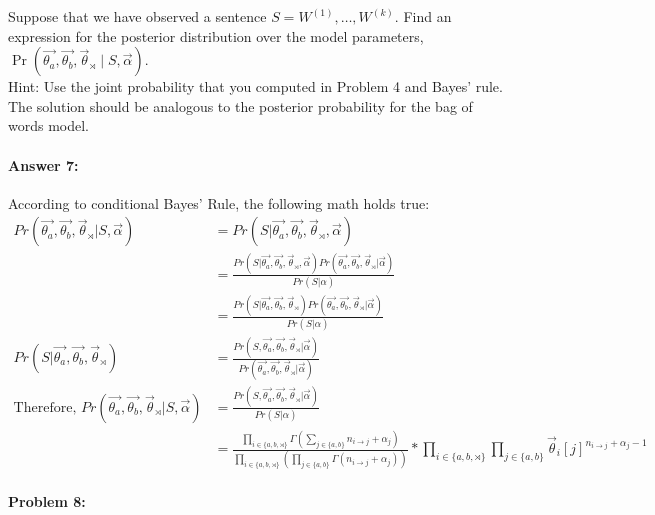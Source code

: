 \documentclass[10pt]{article}
\begin{document}
Suppose that we have observed a sentence
$S=W^{(1)},\dots,W^{(k)}$. Find an expression for the posterior
distribution over the model parameters,
$\Pr(\vec{\theta_a}, \vec{\theta_b}, \vec{\theta}_{\rtimes} \mid S,
\vec{\alpha})$.\\

\noindent Hint: Use the joint probability that you computed in Problem
4 and Bayes' rule. The solution should be analogous to the posterior
probability for the bag of words model.

\paragraph{Answer 7:} According to conditional Bayes' Rule, the following math holds true:
\begin{equation*}
    \begin{split}
        Pr(\vec{\theta_a}, \vec{\theta_b}, \vec{\theta}_{\rtimes} | S, \vec{\alpha}) 
        &= Pr(S | \vec{\theta_a}, \vec{\theta_b}, \vec{\theta}_{\rtimes}, \vec{\alpha})\\
        &= \frac{Pr(S | \vec{\theta_a}, \vec{\theta_b}, \vec{\theta}_{\rtimes}, \vec{\alpha}) Pr(\vec{\theta_a}, \vec{\theta_b}, \vec{\theta}_{\rtimes} | \vec{\alpha})}{Pr(S | \alpha)}\\
        &=\frac{Pr(S | \vec{\theta_a}, \vec{\theta_b}, \vec{\theta}_{\rtimes}) Pr(\vec{\theta_a}, \vec{\theta_b}, \vec{\theta}_{\rtimes} | \vec{\alpha})}{Pr(S|\alpha)}\\
        Pr(S | \vec{\theta_a}, \vec{\theta_b}, \vec{\theta}_{\rtimes}) 
        &= \frac{Pr(S, \vec{\theta_a}, \vec{\theta_b}, \vec{\theta}_{\rtimes} | \vec{\alpha})}{Pr(\vec{\theta_a}, \vec{\theta_b}, \vec{\theta}_{\rtimes} | \vec{\alpha})}\\
        \text{Therefore, } Pr(\vec{\theta_a}, \vec{\theta_b}, \vec{\theta}_{\rtimes} | S, \vec{\alpha}) 
        &=\frac{Pr(S, \vec{\theta_a}, \vec{\theta_b}, \vec{\theta}_{\rtimes} | \vec{\alpha})}{Pr(S|\alpha)}\\
        &= \frac{\prod_{i \in \{a,b,\rtimes\}}\Gamma(\sum_{j \in \{a,b\}} n_{i \rightarrow j} + \alpha_{j})}{\prod_{i\in\{a,b,\rtimes\}}(\prod_{j\in\{a,b\}}\Gamma(n_{i \rightarrow j} + \alpha_{j}))}
        * \prod_{i \in \{a, b, \rtimes\}} \prod_{j \in \{a, b\}} \vec{\theta}_i[j]^{n_{i \rightarrow j}+\alpha_j-1}
    \end{split}
\end{equation*}

\hrulefill
\paragraph{Problem 8:}
\end{document}
